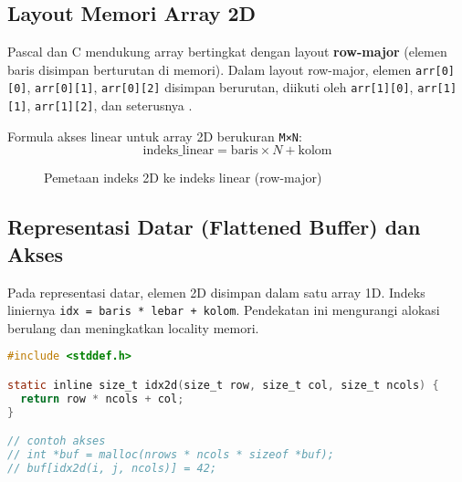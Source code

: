 \documentclass[../main.tex]{subfiles}
\begin{document}
\subsection{Layout Memori Array 2D}

Pascal dan C mendukung array bertingkat dengan layout \textbf{row-major} (elemen baris disimpan berturutan di memori). Dalam layout row-major, elemen \texttt{arr[0][0]}, \texttt{arr[0][1]}, \texttt{arr[0][2]} disimpan berurutan, diikuti oleh \texttt{arr[1][0]}, \texttt{arr[1][1]}, \texttt{arr[1][2]}, dan seterusnya \parencite{free-pascal-docs,cplusplus-multidimensional}.

Formula akses linear untuk array 2D berukuran \texttt{M×N}:
\[
\mathrm{indeks\_linear} = \mathrm{baris} \times N + \mathrm{kolom}
\]

\begin{figure}[H]
  \centering
  \caption{Pemetaan indeks 2D ke indeks linear (row-major)}
  \label{fig:row-major-mapping}
\end{figure}

\subsection{Representasi Datar (Flattened Buffer) dan Akses}
Pada representasi datar, elemen 2D disimpan dalam satu array 1D. Indeks liniernya \texttt{idx = baris * lebar + kolom}. Pendekatan ini mengurangi alokasi berulang dan meningkatkan locality memori.

\begin{lstlisting}[language=C, caption={Helper untuk indeks linier 2D pada buffer datar (C)}]
#include <stddef.h>

static inline size_t idx2d(size_t row, size_t col, size_t ncols) {
  return row * ncols + col;
}

// contoh akses
// int *buf = malloc(nrows * ncols * sizeof *buf);
// buf[idx2d(i, j, ncols)] = 42;
\end{lstlisting}
\end{document}
